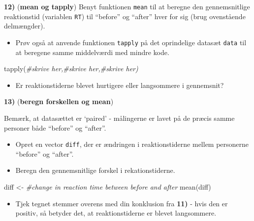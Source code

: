 \documentclass[
]{book}
\newenvironment{Shaded}{\begin{snugshade}}{\end{snugshade}}
\newcommand{\CommentTok}[1]{\textcolor[rgb]{0.56,0.35,0.01}{\textit{#1}}}
\newcommand{\FunctionTok}[1]{\textcolor[rgb]{0.00,0.00,0.00}{#1}}
\newcommand{\NormalTok}[1]{#1}
\newcommand{\OtherTok}[1]{\textcolor[rgb]{0.56,0.35,0.01}{#1}}
\providecommand{\tightlist}{%
  \setlength{\itemsep}{0pt}\setlength{\parskip}{0pt}}
\begin{document}
\textbf{12)} (\textbf{mean og tapply}) Benyt funktionen \texttt{mean} til at beregne den gennemsnitlige reaktionstid (variablen \texttt{RT}) til ``before'' og ``after'' hver for sig (brug ovenstående delmængder).

\begin{itemize}
\tightlist
\item
  Prøv også at anvende funktionen \texttt{tapply} på det oprindelige datasæt \texttt{data} til at beregene samme middelværdi med mindre kode.
\end{itemize}

\begin{Shaded}
\begin{Highlighting}[]
\FunctionTok{tapply}\NormalTok{(}\CommentTok{\#skrive her,\#skrive her,\#skrive her)}
\end{Highlighting}
\end{Shaded}

\begin{itemize}
\tightlist
\item
  Er reaktionstiderne blevet hurtigere eller langsommere i gennemsnit?
\end{itemize}

\textbf{13)} (\textbf{beregn forskellen og mean})

Bemærk, at datasættet er `paired' - målingerne er lavet på de præcis samme personer både ``before'' og ``after''.

\begin{itemize}
\tightlist
\item
  Opret en vector \texttt{diff}, der er ændringen i reaktionstiderne mellem personerne ``before'' og ``after''.
\item
  Beregn den gennemsnitlige forskel i rekationstiderne.
\end{itemize}

\begin{Shaded}
\begin{Highlighting}[]
\NormalTok{diff }\OtherTok{\textless{}{-}} \CommentTok{\#change in reaction time between before and after}
\FunctionTok{mean}\NormalTok{(diff)}
\end{Highlighting}
\end{Shaded}

\begin{itemize}
\tightlist
\item
  Tjek tegnet stemmer overens med din konklusion fra \textbf{11)} - hvis den er positiv, så betyder det, at reaktionstiderne er blevet langsommere.
\end{itemize}
\end{document}
